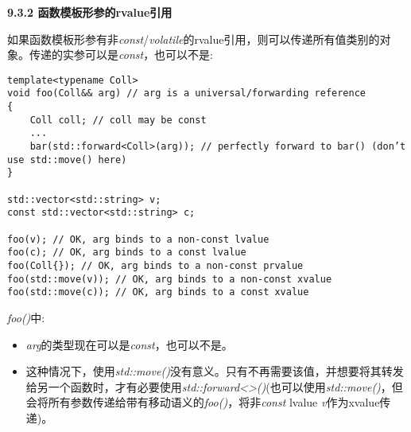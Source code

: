 \hspace*{\fill} \par %
\textbf{9.3.2 函数模板形参的rvalue引用}

如果函数模板形参有非\textit{const}/\textit{volatile}的rvalue引用，则可以传递所有值类别的对象。传递的实参可以是\textit{const}，也可以不是:\par

\begin{lstlisting}[caption={}]
template<typename Coll>
void foo(Coll&& arg) // arg is a universal/forwarding reference
{
	Coll coll; // coll may be const
	...
	bar(std::forward<Coll>(arg)); // perfectly forward to bar() (don’t use std::move() here)
}

std::vector<std::string> v;
const std::vector<std::string> c;

foo(v); // OK, arg binds to a non-const lvalue
foo(c); // OK, arg binds to a const lvalue
foo(Coll{}); // OK, arg binds to a non-const prvalue
foo(std::move(v)); // OK, arg binds to a non-const xvalue
foo(std::move(c)); // OK, arg binds to a const xvalue
\end{lstlisting}

\textit{foo()}中:\par

\begin{itemize}
	\item \textit{arg}的类型现在可以是\textit{const}，也可以不是。
	\item 这种情况下，使用\textit{std::move()}没有意义。只有不再需要该值，并想要将其转发给另一个函数时，才有必要使用\textit{std::forward<>()}(也可以使用\textit{std::move()}，但会将所有参数传递给带有移动语义的\textit{foo()}，将非\textit{const} lvalue \textit{v}作为xvalue传递)。
\end{itemize}












